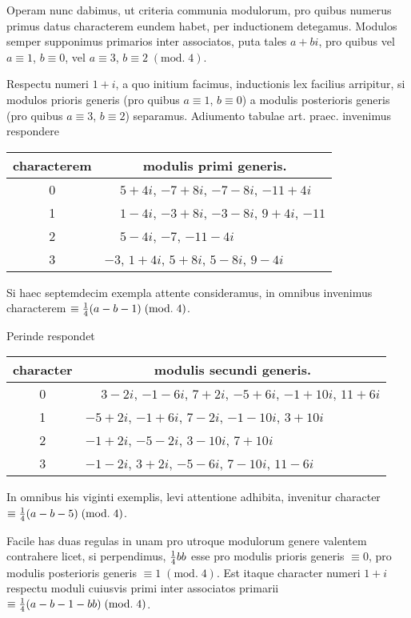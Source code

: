 \documentclass[twoside,12pt, showframe]{memoir}
\renewcommand{\pmod}[1]{\;(\textrm{mod.}\;#1)}
\let\oldfrac\frac
\def\frac#1#2{\mathchoice{\tfrac{#1}{#2}}{\oldfrac{#1}{#2}}{\genfrac{}{}{}{2}{#1}{#2\mathstrut}}{\genfrac{}{}{}{3}{#1}{#2\mathstrut}}}
\begin{document}
Operam nunc dabimus, ut criteria communia modulorum, pro quibus numerus primus datus characterem eundem habet, per inductionem detegamus. Modulos semper supponimus primarios inter associatos, puta tales \(a+b i\), pro quibus vel \(a \equiv 1\), \( b \equiv 0\), vel \(a \equiv 3\), \( b \equiv 2\pmod{4}\).
 
Respectu numeri \(1+i\), a quo initium facimus, inductionis lex facilius arripitur, si modulos prioris generis (pro quibus \(a \equiv 1\), \( b \equiv 0\)) a modulis posterioris generis (pro quibus \(a \equiv 3\), \( b \equiv 2\)) separamus. Adiumento tabulae art. praec. invenimus respondere\clearpage\noindent%
\begin{center}
\begin{tabular}{c|l}
characterem & \multicolumn{1}{c}{modulis primi generis.} \\
\hline
0 & \(\phantom{+}5+4 i\), \(-7+8 i\), \(-7-8 i\), \(-11+4 i\) \\
1 & \(\phantom{+}1-4 i\), \(-3+8 i\), \(-3-8 i\), \( 9+4i\), \(-11\) \\
2 & \(\phantom{+}5-4 i\), \(-7\), \(-11-4 i\) \\
3 & \(-3\), \(1+4 i\), \( 5+8 i\), \( 5-8 i\), \( 9-4 i\) \\
\end{tabular}
\end{center}
Si haec septemdecim exempla attente consideramus, in omnibus invenimus characterem \(\equiv \frac{1}{4}(a-b-1)\pmod{4}\).

Perinde respondet
\begin{center}
\begin{tabular}{c|l}
character & \multicolumn{1}{c}{modulis secundi generis.} \\
\hline
0 & \(\phantom{+}3-2 i\), \(-1-6 i\), \( 7+2 i\), \(-5+6 i\), \(-1+10 i\), \( 11+6 i\) \\
1 & \(-5+2 i\), \(-1+6 i\), \( 7-2 i\), \(-1-10 i\), \( 3+10 i\) \\
2 & \(-1+2 i\), \(-5-2 i\), \( 3-10 i\), \( 7+10 i\) \\
3 & \(-1-2 i\), \( 3+2 i\), \(-5-6 i\), \( 7-10 i\), \( 11-6 i\) \\
\end{tabular}
\end{center}
In omnibus his viginti exemplis, levi attentione adhibita, invenitur character \(\equiv \frac{1}{4}(a-b-5)\pmod{4}\).

Facile has duas regulas in unam pro utroque modulorum genere valentem contrahere licet, si perpendimus, \(\frac{1}{4} b b\) esse pro modulis prioris generis \(\equiv 0\), pro modulis posterioris generis \(\equiv 1\pmod{4}\). Est itaque character numeri \(1+i\) respectu moduli cuiusvis primi inter associatos primarii \(\equiv \frac{1}{4}(a-b-1-b b)\pmod{4}\).
 
\end{document}

